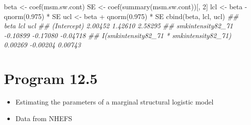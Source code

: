 \documentclass[
  10pt,
  a4paper,
]{book}
\newenvironment{Shaded}{\begin{snugshade}}{\end{snugshade}}
\newcommand{\DecValTok}[1]{\textcolor[rgb]{0.68,0.00,0.00}{#1}}
\newcommand{\DocumentationTok}[1]{\textcolor[rgb]{0.37,0.37,0.37}{\textit{#1}}}
\newcommand{\FloatTok}[1]{\textcolor[rgb]{0.68,0.00,0.00}{#1}}
\newcommand{\FunctionTok}[1]{\textcolor[rgb]{0.28,0.35,0.67}{#1}}
\newcommand{\NormalTok}[1]{\textcolor[rgb]{0.00,0.46,0.62}{#1}}
\newcommand{\OtherTok}[1]{\textcolor[rgb]{0.00,0.46,0.62}{#1}}
\newcommand{\SpecialCharTok}[1]{\textcolor[rgb]{0.37,0.37,0.37}{#1}}
\providecommand{\tightlist}{%
  \setlength{\itemsep}{0pt}\setlength{\parskip}{0pt}}
\begin{document}
\begin{Shaded}
\begin{Highlighting}[]
\NormalTok{beta }\OtherTok{\textless{}{-}} \FunctionTok{coef}\NormalTok{(msm.sw.cont)}
\NormalTok{SE }\OtherTok{\textless{}{-}} \FunctionTok{coef}\NormalTok{(}\FunctionTok{summary}\NormalTok{(msm.sw.cont))[, }\DecValTok{2}\NormalTok{]}
\NormalTok{lcl }\OtherTok{\textless{}{-}}\NormalTok{ beta }\SpecialCharTok{{-}} \FunctionTok{qnorm}\NormalTok{(}\FloatTok{0.975}\NormalTok{) }\SpecialCharTok{*}\NormalTok{ SE}
\NormalTok{ucl }\OtherTok{\textless{}{-}}\NormalTok{ beta }\SpecialCharTok{+} \FunctionTok{qnorm}\NormalTok{(}\FloatTok{0.975}\NormalTok{) }\SpecialCharTok{*}\NormalTok{ SE}
\FunctionTok{cbind}\NormalTok{(beta, lcl, ucl)}
\DocumentationTok{\#\#                                              beta      lcl      ucl}
\DocumentationTok{\#\# (Intercept)                               2.00452  1.42610  2.58295}
\DocumentationTok{\#\# smkintensity82\_71                        {-}0.10899 {-}0.17080 {-}0.04718}
\DocumentationTok{\#\# I(smkintensity82\_71 * smkintensity82\_71)  0.00269 {-}0.00204  0.00743}
\end{Highlighting}
\end{Shaded}

\section{Program 12.5}\label{program-12.5}

\begin{itemize}
\tightlist
\item
  Estimating the parameters of a marginal structural logistic model
\item
  Data from NHEFS
\end{itemize}
\end{document}

